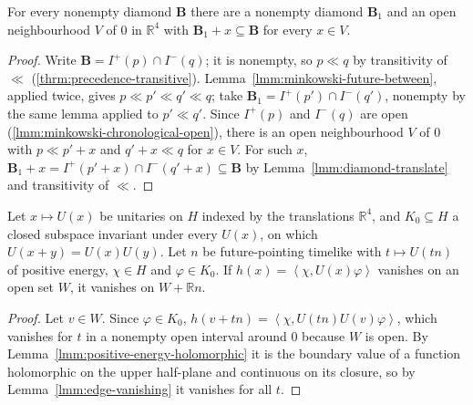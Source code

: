 \begin{lemma}
    \label{lmm:diamond-small-translates}
    \leanok
    For every nonempty diamond $\mathbf{B}$ there are a nonempty diamond $\mathbf{B}_1$ and an open neighbourhood $V$ of $0$ in $\mathbb{R}^4$ with $\mathbf{B}_1 + x \subseteq \mathbf{B}$ for every $x \in V$.
\end{lemma}
\begin{proof}
    \leanok
    Write $\mathbf{B} = I^+(p) \cap I^-(q)$; it is nonempty, so $p \ll q$ by transitivity of $\ll$ (\ref{thrm:precedence-transitive}). Lemma~\ref{lmm:minkowski-future-between}, applied twice, gives $p \ll p' \ll q' \ll q$; take $\mathbf{B}_1 = I^+(p') \cap I^-(q')$, nonempty by the same lemma applied to $p' \ll q'$. Since $I^+(p)$ and $I^-(q)$ are open (\ref{lmm:minkowski-chronological-open}), there is an open neighbourhood $V$ of $0$ with $p \ll p' + x$ and $q' + x \ll q$ for $x \in V$. For such $x$, $\mathbf{B}_1 + x = I^+(p'+x) \cap I^-(q'+x) \subseteq \mathbf{B}$ by Lemma~\ref{lmm:diamond-translate} and transitivity of $\ll$.
\end{proof}

\begin{lemma}
    \label{lmm:timelike-spreading-direction}
    \leanok
    Let $x \mapsto U(x)$ be unitaries on $H$ indexed by the translations $\mathbb{R}^4$, and $K_0 \subseteq H$ a closed subspace invariant under every $U(x)$, on which $U(x+y) = U(x)U(y)$. Let $n$ be future-pointing timelike with $t \mapsto U(tn)$ of positive energy, $\chi \in H$ and $\varphi \in K_0$. If $h(x) = \left< \chi, U(x)\varphi \right>$ vanishes on an open set $W$, it vanishes on $W + \mathbb{R}n$.
\end{lemma}
\begin{proof}
    \leanok
    Let $v \in W$. Since $\varphi \in K_0$, $h(v + tn) = \left< \chi, U(tn)U(v)\varphi \right>$, which vanishes for $t$ in a nonempty open interval around $0$ because $W$ is open. By Lemma~\ref{lmm:positive-energy-holomorphic} it is the boundary value of a function holomorphic on the upper half-plane and continuous on its closure, so by Lemma~\ref{lmm:edge-vanishing} it vanishes for all $t$.
\end{proof}

